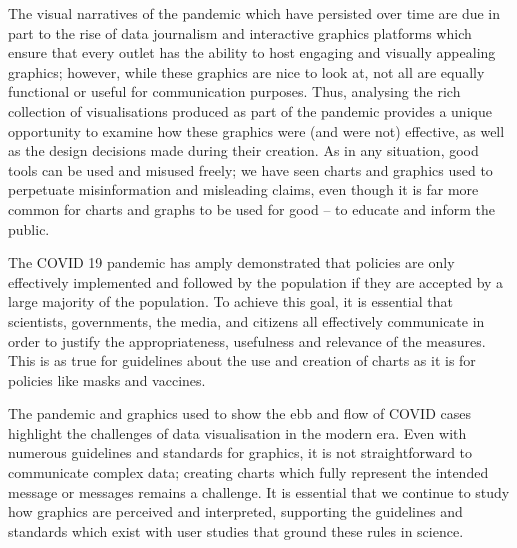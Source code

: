 \documentclass[article]{jdssv}\usepackage[]{graphicx}\usepackage[]{color}
\begin{document}
The visual narratives of the pandemic which have persisted over time are due in part to the rise of data journalism and interactive graphics platforms which ensure that every outlet has the ability to host engaging and visually appealing graphics; however, while these graphics are nice to look at, not all are equally functional or useful for communication purposes. Thus, analysing the rich collection of visualisations produced as part of the pandemic provides a unique opportunity to examine how these graphics were (and were not) effective, as well as the design decisions made during their creation. As in any situation, good tools can be used and misused freely; we have seen charts and graphics used to perpetuate misinformation and misleading claims, even though it is far more common for charts and graphs to be used for good -- to educate and inform the public.

The COVID 19 pandemic has amply demonstrated that policies are only effectively implemented and followed by the population if they are accepted by a large majority of the population. To achieve this goal, it is essential that scientists, governments, the media, and citizens all effectively communicate in order to justify the appropriateness, usefulness and relevance of the measures. This is as true for guidelines about the use and creation of charts as it is for policies like masks and vaccines. %

The pandemic and graphics used to show the ebb and flow of COVID cases highlight the challenges of data visualisation in the modern era. Even with numerous guidelines and standards for graphics, it is not straightforward to communicate complex data; creating charts which fully represent the intended message or messages remains a challenge. It is essential that we continue to study how graphics are perceived and interpreted, supporting the guidelines and standards which exist with user studies that ground these rules in science. 

\end{document}
